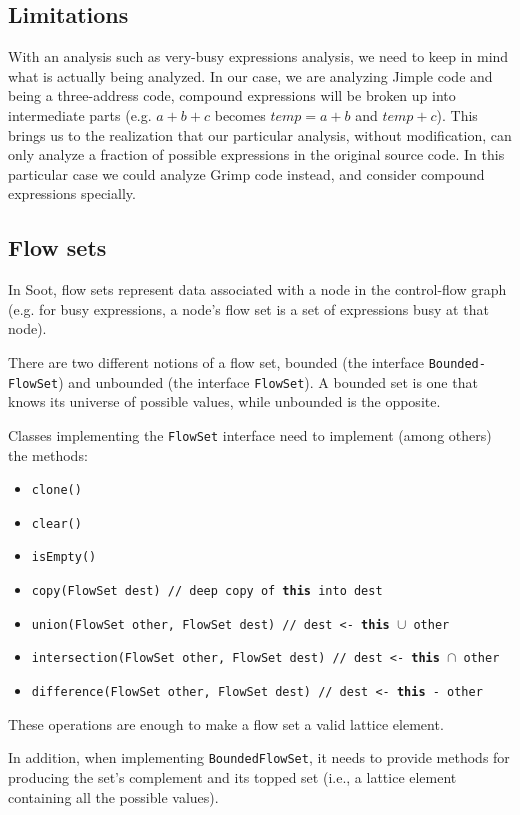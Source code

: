 \documentclass{article}
\newcommand{\keyw}[1]{\texttt{\textbf{#1}}}
\newcommand{\code}[1]{\texttt{\small #1}}
\begin{document}
\subsection{Limitations}

With an analysis such as very-busy expressions analysis, we need to
keep in mind what is actually being analyzed. In our case, we are
analyzing Jimple code and being a three-address code, compound
expressions will be broken up into intermediate parts (e.g. $a + b +
c$ becomes $temp = a + b$ and $temp + c$). This brings us to the
realization that our particular analysis, without modification, can
only analyze a fraction of possible expressions in the original source
code. In this particular case we could analyze Grimp code instead, and
consider compound expressions specially.

\subsection{Flow sets}
\label{section:flowsets}

In Soot, flow sets represent data associated with a node in the
control-flow graph (e.g. for busy expressions, a node's flow set is a
set of expressions busy at that node).

There are two different notions of a flow set, bounded (the interface
\code{Bounded- FlowSet}) and unbounded (the interface
\code{FlowSet}). A bounded set is one that knows its universe of
possible values, while unbounded is the opposite.

Classes implementing the \code{FlowSet} interface need to implement
(among others) the methods:
\begin{itemize}
\item \code{clone()}
\item \code{clear()}
\item \code{isEmpty()}
\item \code{copy(FlowSet dest) // deep copy of \keyw{this} into dest}
\item \code{union(FlowSet other, FlowSet dest) // dest <- \keyw{this}
    $\cup$ other}
\item \code{intersection(FlowSet other, FlowSet dest) // dest <-
    \keyw{this} $\cap$ other}
\item \code{difference(FlowSet other, FlowSet dest) // dest <-
    \keyw{this} - other}
\end{itemize}
These operations are enough to make a flow set a valid lattice
element.

In addition, when implementing \code{BoundedFlowSet}, it needs to
provide methods for producing the set's complement and its topped set
(i.e., a lattice element containing all the possible values).
\end{document}

